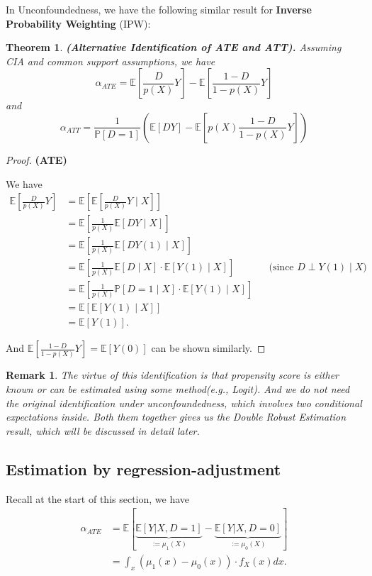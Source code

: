 \documentclass[11pt,a4paper]{amsart}
\theoremstyle{plain}
\newtheorem{theorem}{Theorem}
\newtheorem*{remark*}{Remark}
\theoremstyle{definition}
\begin{document}
	In Unconfoundedness, we have the following similar result for \textbf{Inverse Probability Weighting} (IPW):
	\begin{theorem}
			\textbf{(Alternative Identification of ATE and ATT).} Assuming CIA and common support assumptions, we have 
			\[	\alpha_{A T E} = \mathbb{E}\left[\frac{D}{p(X)}Y\right]-\mathbb{E}\left[\frac{1-D}{1-p(X)}Y\right]	\]
			and
			\[	\alpha_{ATT} = 
			\frac{1}{\mathbb{P}[D=1]}\left(\mathbb{E}[DY] - \mathbb{E}\left[p(X)\frac{1-D}{1-p(X)}Y\right]\right)	\]	
	\end{theorem}
	\begin{proof}
		\textbf{(ATE)} \par 
		We have 
		\[	\begin{aligned}
			\mathbb{E}\left[\frac{D}{p(X)}Y\right]	&= \mathbb{E}\left[ \mathbb{E}\left[\frac{D}{p(X)}Y \mid X\right]\right]	\\
			&=   \mathbb{E}\left[\frac{1}{p(X)} \mathbb{E}\left[DY \mid X\right]\right] \\
			&=   \mathbb{E}\left[\frac{1}{p(X)} \mathbb{E}\left[DY(1) \mid X\right]\right] \\
			&=   \mathbb{E}\left[\frac{1}{p(X)}\mathbb{E}\left[D \mid X\right] \cdot \mathbb{E}\left[Y(1) \mid X\right]\right] &&\text{(since $D \perp Y(1) \mid X$)}\\
			&=  \mathbb{E}\left[\frac{1}{p(X)}\mathbb{P}\left[D =1 \mid X\right] \cdot \mathbb{E}\left[Y(1) \mid X\right]\right] \\
			&=  \mathbb{E}\left[ \mathbb{E}\left[Y(1) \mid X\right]\right] \\
			&= \mathbb{E}[Y(1)].
		\end{aligned}	\]
		
	 And $\mathbb{E}\left[\frac{1-D}{1-p(X)}Y\right] = \mathbb{E}\left[Y(0)\right]$ can be shown similarly.
	\end{proof}
	
	\begin{remark*}
			The virtue of this identification is that propensity score is either known or can be estimated using some method(e.g., Logit). And we do not need the original identification under unconfoundedness, which involves two conditional expectations inside. Both them together gives us the Double Robust Estimation result, which will be discussed in detail later.
	\end{remark*}

\subsection{Estimation by regression-adjustment}\hfill\par 
	Recall at the start of this section, we have
			\[	\begin{aligned}
	\alpha_{A T E} &= \mathbb{E}[\underbrace{\mathbb{E}[Y|X,D=1]}_{:= \mu_{1}(X)} - \underbrace{\mathbb{E}[Y|X,D=0]}_{:= \mu_{0}(X)} ] \\
	&= \int_{x} (\mu_{1}(x)-\mu_{0}(x)) \cdot f_{X}(x)dx.
	\end{aligned}	\]
	
\end{document}
